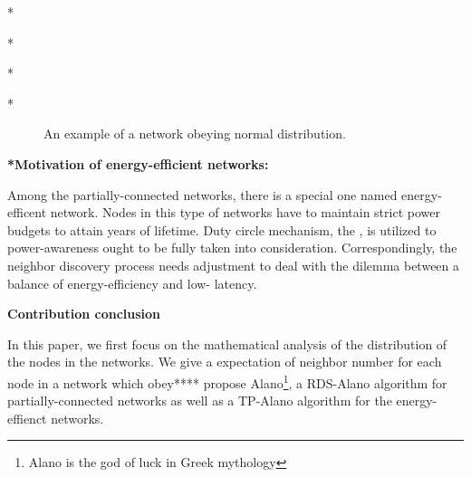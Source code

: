 *

*

*

*

\begin{figure}[!t]
\centering
{}
\vspace{0.03in}
\caption{An example of a network obeying normal distribution.}
\label{NDexample}
\end{figure}


\textbf{*Motivation of energy-efficient networks:}



Among the partially-connected networks, there is a special 
one named energy-efficent network.
Nodes in this type of networks have to maintain 
strict power budgets to attain years of lifetime\cite{dunkels2011contikimac}.
Duty circle mechanism, the , is utilized to power-awareness ought to be fully taken into consideration.
Correspondingly, the neighbor discovery process needs adjustment to deal with the dilemma between 
a balance of energy-efficiency and low- latency.


\textbf{Contribution conclusion}

In this paper, we first focus on the mathematical analysis of the distribution of the nodes in the networks.
We give a expectation of neighbor number for each node in a network which obey****
  propose Alano\footnote{Alano is the god of luck in Greek mythology }, 
a RDS-Alano algorithm for partially-connected networks 
as well as a TP-Alano algorithm for the energy-effienct networks.




